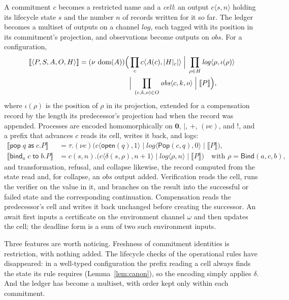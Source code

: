 \documentclass[11pt,openany]{book}
\theoremstyle{remark}
\newcommand{\Pop}{\mathsf{Pop}}
\newcommand{\Bind}{\mathsf{Bind}}
\newcommand{\dom}{\operatorname{dom}}
\begin{document}
A commitment $c$ becomes a restricted name and a \emph{cell}: an output
$c\langle s,n\rangle$ holding its lifecycle state $s$ and the number $n$ of
records written for it so far. The ledger becomes a multiset of outputs on
a channel $\mathit{log}$, each tagged with its position in its commitment's
projection, and observations become outputs on $\mathit{obs}$. For a
configuration,
\[
\begin{aligned}
\llbracket\langle P,S,A,O,H\rangle\rrbracket=
(\nu\,\dom(A))\Bigl(&\prod_{c}c\langle A(c),|H|_c|\rangle\;\Big|\;
\prod_{\rho\in H}\mathit{log}\langle\rho,\iota(\rho)\rangle\\
&\Big|\;\prod_{(c,k,o)\in O}\mathit{obs}\langle c,k,o\rangle\;\Big|\;
\llbracket P\rrbracket\Bigr),
\end{aligned}
\]
where $\iota(\rho)$ is the position of $\rho$ in its projection,
extended for a compensation record by the length its predecessor's
projection had when the record was appended. Processes are encoded
homomorphically on $\mathbf 0$, $\mid$, $+$, $(\nu c)$, and $!$, and a
prefix that advances $c$ reads its cell, writes it back, and logs:
\[
\begin{aligned}
\llbracket\mathsf{pop}\;q\;\mathsf{as}\;c.P\rrbracket
&=\tau.(\nu c)\bigl(c\langle\mathsf{open}(q),1\rangle\mid
\mathit{log}\langle\Pop(c,q),0\rangle\mid\llbracket P\rrbracket\bigr),\\
\llbracket\mathsf{bind}_a\;c\;\mathsf{to}\;b.P\rrbracket
&=c(s,n).\bigl(c\langle\delta(s,\rho),n+1\rangle\mid
\mathit{log}\langle\rho,n\rangle\mid\llbracket P\rrbracket\bigr)
\quad\text{with }\rho=\Bind(a,c,b),
\end{aligned}
\]
and transformation, refusal, and collapse likewise, the record computed
from the state read and, for collapse, an $\mathit{obs}$ output added.
Verification reads the cell, runs the verifier on the value in it, and
branches on the result into the successful or failed state and the
corresponding continuation. Compensation reads the predecessor's cell and
writes it back unchanged before creating the successor. An await first
inputs a certificate on the environment channel $\omega$ and then updates
the cell; the deadline form is a sum of two such environment inputs.

Three features are worth noticing. Freshness of commitment identities is
restriction, with nothing added. The lifecycle checks of the operational
rules have disappeared: in a well-typed configuration the prefix reading a
cell always finds the state its rule requires (Lemma~\ref{lem:canon}), so
the encoding simply applies $\delta$. And the ledger has become a
multiset, with order kept only within each commitment.
\end{document}
